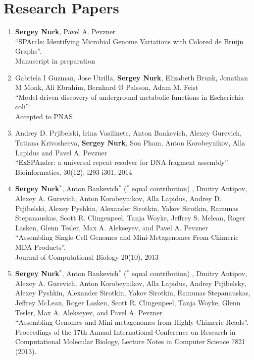 \section{Research Papers}
%
\begin{enumerate}
\item 
\textbf{Sergey Nurk}, Pavel A. Pevzner\\
``SPArcle: Identifying Microbial Genome Variations with Colored de Bruijn Graphs''. \\
Manuscript in preparation

\item Gabriela I Guzman, Jose Utrilla, \textbf{Sergey Nurk}, Elizabeth Brunk, Jonathan M Monk, Ali Ebrahim, Bernhard Ø Palsson, Adam M. Feist\\
``Model-driven discovery of underground metabolic functions in Escherichia coli''. \\
Accepted to PNAS

\item Andrey D. Prjibelski, Irina Vasilinetc, Anton Bankevich, Alexey Gurevich, Tatiana Krivosheeva, \textbf{Sergey Nurk}, Son Pham, Anton Korobeynikov, Alla Lapidus and Pavel A. Pevzner\\
``ExSPAnder: a universal repeat resolver for DNA fragment assembly''. \\
Bioinformatics, 30(12), i293-i301, 2014

\item \textbf{Sergey Nurk}$^*$, Anton Bankevich$^*$ ($^*$ equal contribution)%
, Dmitry Antipov, Alexey A. Gurevich, Anton Korobeynikov, Alla Lapidus, Andrey D. Prjibelski, Alexey Pyshkin, Alexander Sirotkin, Yakov Sirotkin, Ramunas Stepanauskas, Scott R. Clingenpeel, Tanja Woyke, Jeffrey S. Mclean, Roger Lasken, Glenn Tesler, Max A. Alekseyev, and Pavel A. Pevzner \\
``Assembling Single-Cell Genomes and Mini-Metagenomes From Chimeric MDA Products''. \\
Journal of Computational Biology 20(10), 2013

\item \textbf{Sergey Nurk}$^*$, Anton Bankevich$^*$ ($^*$ equal contribution)%
, Dmitry Antipov, Alexey A. Gurevich, Anton Korobeynikov, Alla Lapidus, Andrey Prjibelsky, Alexey Pyshkin, Alexander Sirotkin, Yakov Sirotkin, Ramunas Stepanauskas, Jeffrey McLean, Roger Lasken, Scott R. Clingenpeel, Tanja Woyke, Glenn Tesler, Max A. Alekseyev, and Pavel A. Pevzner \\
``Assembling Genomes and Mini-metagenomes from Highly Chimeric Reads''. \\
Proceedings of the 17th Annual International Conference on Research in Computational Molecular Biology, Lecture Notes in Computer Science 7821 (2013).


\end{enumerate}

